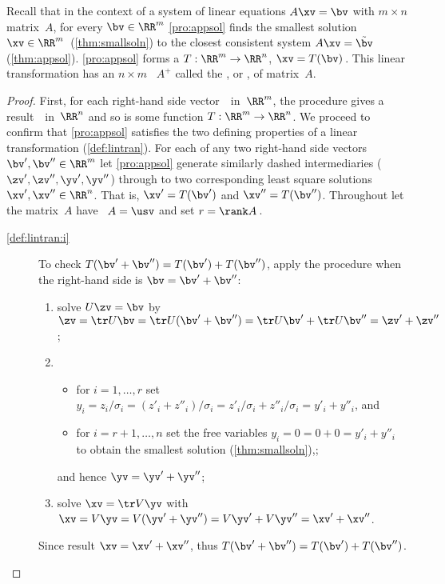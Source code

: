 \begin{theorem} \label{thm:lsqlt}
Recall that in the context of a system of linear equations \(A\xv=\bv\) with \(m\times n\) matrix~\(A\), for every \(\bv\in\RR^m\) \autoref{pro:appsol} finds the smallest solution~\(\xv\in\RR^m\)\ (\autoref{thm:smallsoln}) to the closest consistent system \(A\xv=\tilde\bv\) (\autoref{thm:appsol}).
\autoref{pro:appsol} forms a  \(T:\RR^m\to\RR^n\), \(\xv=T(\bv)\)\,.
This linear transformation has an \(n\times m\) ~\(A^+\) called the , or , of matrix~\(A\).
\end{theorem}

\begin{proof} 
First, for each right-hand side vector~\bv\ in~\(\RR^m\), the procedure gives a result~\xv\ in~\(\RR^n\) and so is some function \(T:\RR^m\to\RR^n\).
We proceed to confirm that \autoref{pro:appsol} satisfies the two defining properties of a linear transformation (\autoref{def:lintran}).
For each of any two right-hand side vectors \(\bv',\bv''\in\RR^m\) let \autoref{pro:appsol} generate similarly dashed intermediaries (\(\zv',\zv'',\yv',\yv''\)) through to two corresponding least square solutions~\(\xv',\xv''\in\RR^n\).
That is, \(\xv'=T(\bv')\) and \(\xv''=T(\bv'')\).
Throughout let the matrix~\(A\) have \svd\ \(A=\usv\) and set \(r=\rank A\)\,.
\begin{description}
\item[\ref{def:lintran:i}]  
To check \(T(\bv'+\bv'')=T(\bv')+T(\bv'')\), apply the procedure when the right-hand side is \(\bv=\bv'+\bv''\):
\begin{enumerate}
\item solve \(U\zv=\bv\) by \(\zv=\tr U\bv=\tr U(\bv'+\bv'')=\tr U\bv'+\tr U\bv''=\zv'+\zv''\);
\item \begin{itemize}
\item for \(i=1,\ldots,r\) set \(y_i=z_i/\sigma_i=(z'_i+z''_i)/\sigma_i=z'_i/\sigma_i+z''_i/\sigma_i=y'_i+y''_i\), and
\item for \(i=r+1,\ldots,n\) set the free variables \(y_i=0=0+0=y'_i+y''_i\) to obtain the smallest solution (\autoref{thm:smallsoln}),;
\end{itemize}
and hence \(\yv=\yv'+\yv''\);
\item solve \(\xv=\tr V\yv\) with \(\xv=V\yv=V(\yv'+\yv'')=V\yv'+V\yv''=\xv'+\xv''\).
\end{enumerate}
Since result \(\xv=\xv'+\xv''\), thus \(T(\bv'+\bv'')=T(\bv')+T(\bv'')\).


\end{description}
\end{proof}
